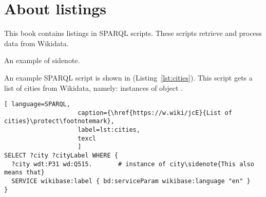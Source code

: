 
\section{About listings}

This book contains listings in SPARQL scripts.
These scripts retrieve and process data from Wikidata.

An example of sidenote.

An example SPARQL script is shown in (Listing~\ref{lst:cities}). 
This script gets a list of cities from Wikidata, 
namely: instances of object .


\begin{lstlisting}[ language=SPARQL, 
                    caption={\href{https://w.wiki/jcE}{List of cities}\protect\footnotemark},
                    label=lst:cities,
                    texcl 
                    ]
SELECT ?city ?cityLabel WHERE { 
  ?city wdt:P31 wd:Q515.       # instance of city\sidenote{This also means that}
  SERVICE wikibase:label { bd:serviceParam wikibase:language "en" }
}
\end{lstlisting}%



